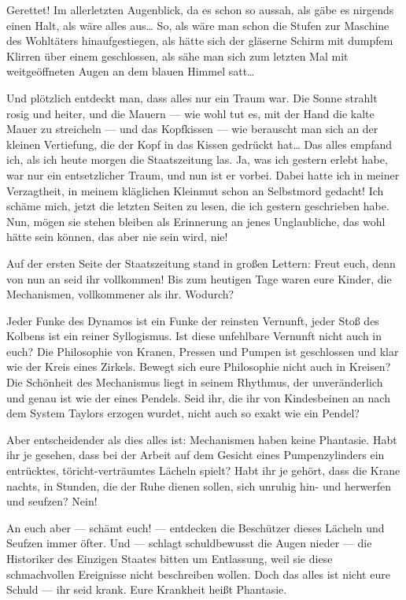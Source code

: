 Gerettet! Im allerletzten Augenblick, da es schon so aussah, als
gäbe es nirgends einen Halt, als wäre alles aus\ldots{} So, als wäre man
schon die Stufen zur Maschine des Wohltäters hinaufgestiegen, als
hätte sich der gläserne Schirm mit dumpfem Klirren über einem
geschlossen, als sähe man sich zum letzten Mal mit weitgeöffneten
Augen an dem blauen Himmel satt\ldots{}

Und plötzlich entdeckt man, dass alles nur ein Traum war. Die Sonne
strahlt rosig und heiter, und die Mauern — wie wohl tut es, mit der
Hand die kalte Mauer zu streicheln — und das Kopfkissen — wie
berauscht man sich an der kleinen Vertiefung, die der Kopf in das
Kissen gedrückt hat\ldots{} Das alles empfand ich, als ich heute morgen
die Staatszeitung las. Ja, was ich gestern erlebt habe, war nur ein
entsetzlicher Traum, und nun ist er vorbei. Dabei hatte ich in
meiner Verzagtheit, in meinem kläglichen Kleinmut schon an
Selbstmord gedacht! Ich schäme mich, jetzt die letzten Seiten zu
lesen, die ich gestern geschrieben habe. Nun, mögen sie stehen
bleiben als Erinnerung an jenes Unglaubliche, das wohl hätte sein
können, das aber nie sein wird, nie!

Auf der ersten Seite der Staatszeitung stand in großen Lettern:
Freut euch, denn von nun an seid ihr vollkommen! Bis zum heutigen
Tage waren eure Kinder, die Mechanismen, vollkommener als ihr.
Wodurch?

Jeder Funke des Dynamos ist ein Funke der reinsten Vernunft, jeder
Stoß des Kolbens ist ein reiner Syllogismus. Ist diese unfehlbare
Vernunft nicht auch in euch? Die Philosophie von Kranen, Pressen
und Pumpen ist geschlossen und klar wie der Kreis eines Zirkels.
Bewegt sich eure Philosophie nicht auch in Kreisen? Die Schönheit
des Mechanismus liegt in seinem Rhythmus, der unveränderlich und
genau ist wie der eines Pendels. Seid ihr, die ihr von Kindesbeinen
an nach dem System Taylors erzogen wurdet, nicht auch so exakt wie
ein Pendel?

Aber entscheidender als dies alles ist: Mechanismen haben keine
Phantasie. Habt ihr je gesehen, dass bei der Arbeit auf dem Gesicht
eines Pumpenzylinders ein entrücktes, töricht-verträumtes Lächeln
spielt? Habt ihr je gehört, dass die Krane nachts, in Stunden, die
der Ruhe dienen sollen, sich unruhig hin- und herwerfen und seufzen?
Nein!

An euch aber — schämt euch! — entdecken die Beschützer dieses
Lächeln und Seufzen immer öfter. Und — schlagt schuldbewusst die
Augen nieder — die Historiker des Einzigen Staates bitten um
Entlassung, weil sie diese schmachvollen Ereignisse nicht
beschreiben wollen. Doch das alles ist nicht eure Schuld — ihr seid
krank. Eure Krankheit heißt Phantasie.


